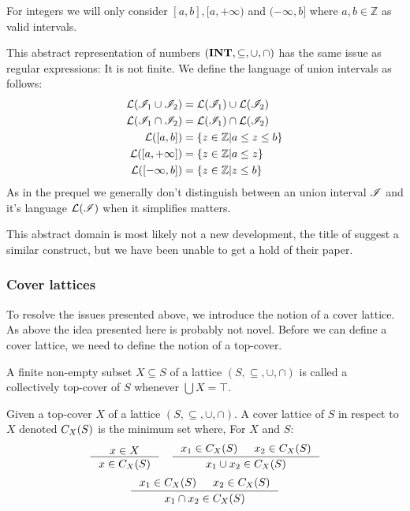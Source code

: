 For integers we will only consider $[a, b], [a, +\infty)$ and $(-\infty, b]$ where $a, b \in \mathbb{Z}$ as valid intervals.

This abstract representation of numbers $(\mathbf{INT}, \subseteq, \cup, \cap)$ has the same issue as regular expressions: It is not finite.
We define the language of union intervals as follows:
\begin{align}
    \mathcal{L}(\mathscr{I}_1 \cup \mathscr{I}_2) &= \mathcal{L}(\mathscr{I}_1) \cup \mathcal{L}(\mathscr{I}_2) \\
    \mathcal{L}(\mathscr{I}_1 \cap \mathscr{I}_2) &= \mathcal{L}(\mathscr{I}_1) \cap \mathcal{L}(\mathscr{I}_2) \\
    \mathcal{L}([a, b]) &= \left\{ z \in \mathbb{Z} \middle| a \leq z \leq b \right\} \\
    \mathcal{L}([a, +\infty]) &= \left\{ z \in \mathbb{Z} \middle| a \leq z \right\} \\
    \mathcal{L}([-\infty, b]) &= \left\{ z \in \mathbb{Z} \middle| z \leq b \right\}
\end{align}
As in the prequel we generally don't distinguish between an union interval $\mathscr{I}$ and it's language $\mathcal{L}(\mathscr{I})$ when it simplifies matters.

This abstract domain is most likely not a new development, the title of \cite{li2010abstract} suggest a similar construct, but we have been unable to get a hold of their paper.

\subsubsection{Cover lattices}\label{sec:cover-lattice}
To resolve the issues presented above, we introduce the notion of a cover lattice.
As above the idea presented here is probably not novel.
Before we can define a cover lattice, we need to define the notion of a top-cover.

\begin{definition}
    A finite non-empty subset $X \subseteq S$ of a lattice $(S, \subseteq, \cup, \cap)$ is called a collectively top-cover of $S$ whenever $\bigcup X = \top$.
\end{definition}

\begin{definition}\label{def:coverlattice}
Given a top-cover $X$ of a lattice $(S, \subseteq, \cup, \cap)$.
A cover lattice of $S$ in respect to $X$ denoted $C_{X}(S)$ is the minimum set where,
For $X$ and $S$:
\[
    \inference{x \in X}{x \in C_X(S)} \quad
    \inference{x_1 \in C_X(S) & x_2 \in C_X(S)}{x_1 \cup  x_2 \in C_X(S)}
\]
\[
    \inference{x_1 \in C_X(S) & x_2 \in C_X(S)}{x_1 \cap  x_2 \in C_X(S)}
\]
\end{definition}

